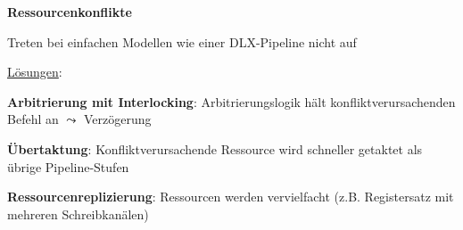 \textbf{Ressourcenkonflikte}
\begin{items}
  \item Treten bei einfachen Modellen wie einer DLX-Pipeline nicht auf
  \item \underline{Lösungen}:
  \begin{enumeration}
    \item \textbf{Arbitrierung mit Interlocking}: Arbitrierungslogik hält konfliktverursachenden Befehl an \( \leadsto \) Verzögerung
    \item \textbf{Übertaktung}: Konfliktverursachende Ressource wird schneller getaktet als übrige Pipeline-Stufen
    \item \textbf{Ressourcenreplizierung}: Ressourcen werden vervielfacht (z.B. Registersatz mit mehreren Schreibkanälen) 
  \end{enumeration}
\end{items}

\newpage

